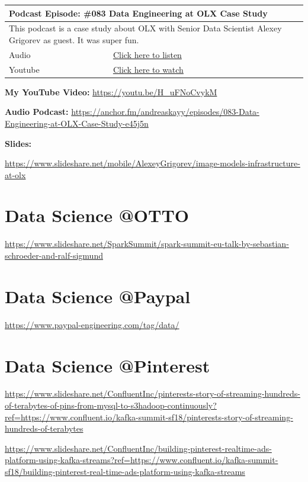 \documentclass[12pt, numbers=noenddot]{scrreprt} %
\begin{document}
\begin{table}[]
\begin{tabular}{ll}
\hline
\multicolumn{2}{l}{\textbf{Podcast Episode:} \#083 Data Engineering at OLX Case Study} \\ \hline
\multicolumn{2}{p{15cm}}{This podcast is a case study about OLX with Senior Data Scientist Alexey Grigorev as guest. It was super fun.}         \\ \hline
\multicolumn{1}{l|}{Audio}     & \href{https://anchor.fm/andreaskayy/episodes/083-Data-Engineering-at-OLX-Case-Study-e45j5n}{Click here to listen}   \\
\multicolumn{1}{l|}{Youtube}   & \href{https://youtu.be/H_uFNoCvykM}{Click here to watch}   \\ \hline
\end{tabular}
\end{table}

\textbf{My YouTube Video:} \url{https://youtu.be/H_uFNoCvykM}

\textbf{Audio Podcast:} \url{https://anchor.fm/andreaskayy/episodes/083-Data-Engineering-at-OLX-Case-Study-e45j5n}

\textbf{Slides:}

\url{https://www.slideshare.net/mobile/AlexeyGrigorev/image-models-infrastructure-at-olx}




\section{Data Science @OTTO}
\url{https://www.slideshare.net/SparkSummit/spark-summit-eu-talk-by-sebastian-schroeder-and-ralf-sigmund}

\section{Data Science @Paypal}
\url{https://www.paypal-engineering.com/tag/data/}

\section{Data Science @Pinterest}
\url{https://www.slideshare.net/ConfluentInc/pinterests-story-of-streaming-hundreds-of-terabytes-of-pins-from-mysql-to-s3hadoop-continuously?ref=https://www.confluent.io/kafka-summit-sf18/pinterests-story-of-streaming-hundreds-of-terabytes}

\url{https://www.slideshare.net/ConfluentInc/building-pinterest-realtime-ads-platform-using-kafka-streams?ref=https://www.confluent.io/kafka-summit-sf18/building-pinterest-real-time-ads-platform-using-kafka-streams}
\end{document}
